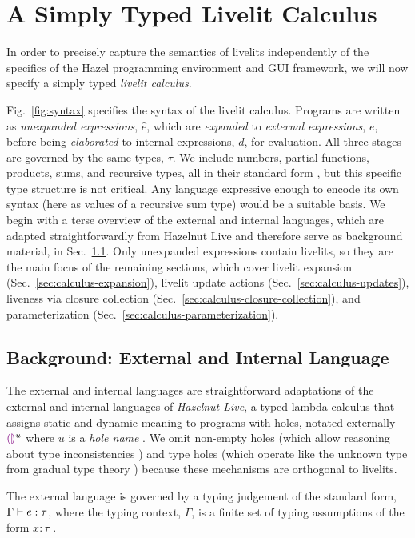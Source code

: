 \section{A Simply Typed Livelit Calculus}\label{sec:livelit-calculus}
In order to precisely capture the semantics of livelits
independently
of the specifics of the Hazel programming environment and GUI
framework, we will now specify a simply typed \emph{livelit calculus}.

Fig.~\ref{fig:syntax} specifies the syntax of the livelit calculus.
Programs are written as \emph{unexpanded expressions}, $\hat e$, which are \emph{expanded} to
\emph{external expressions}, $e$, before being \emph{elaborated}
to internal expressions, $d$, for evaluation. All three stages are governed
by the same types, $\tau$. We include numbers, partial functions, products, sums, and recursive
types, all in their standard form \cite{pfpl}, but this specific type structure is not critical.
Any language expressive
enough to encode its own syntax (here as values of a recursive sum type)
would be a suitable basis. We begin with a terse
overview of the external and internal languages,
which are adapted straightforwardly from Hazelnut Live \cite{HazelnutLive} and therefore
serve as background material, in Sec.~\ref{sec:external-and-internal-lang}.
Only unexpanded expressions contain
livelits, so they are the main focus of the remaining sections,
which cover livelit expansion (Sec.~\ref{sec:calculus-expansion}),
livelit update actions (Sec.~\ref{sec:calculus-updates}),
liveness via closure collection (Sec.~\ref{sec:calculus-closure-collection}),
and parameterization (Sec.~\ref{sec:calculus-parameterization}).


\subsection{Background: External and Internal Language}\label{sec:external-and-internal-lang}
The external and internal languages are straightforward adaptations of the
external and internal languages of \emph{Hazelnut Live},
a typed lambda calculus that assigns static and dynamic meaning to programs with holes,
notated externally $\textcolor{violet}{\llparenthesis}\textcolor{violet}{\rrparenthesis}^{u}$ where $u$ is a \emph{hole name} \cite{HazelnutLive}.
We omit non-empty holes (which allow reasoning about type inconsistencies \cite{Hazelnut}) and type holes
(which operate like the unknown type from gradual type theory \cite{Siek06a,Hazelnut})
because these mechanisms are orthogonal to livelits.

The external language is governed by a typing judgement of the standard form, $\Gamma \vdash e : \tau$,
where the typing context, $\Gamma$,
is a finite set of typing assumptions of the form $x : \tau$ \cite{pfpl}.

